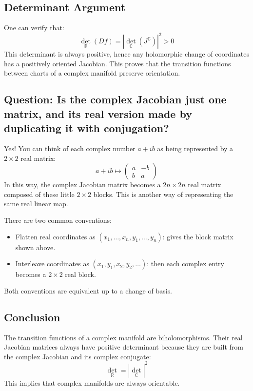\subsection*{Determinant Argument}

One can verify that:
\[
\det_{\mathbb{R}}(Df) = \left| \det_{\mathbb{C}}(J^{\mathbb{C}}) \right|^2 > 0
\]
This determinant is always positive, hence any holomorphic change of coordinates has a positively oriented Jacobian. This proves that the transition functions between charts of a complex manifold preserve orientation.

\subsection*{Question: Is the complex Jacobian just one matrix, and its real version made by duplicating it with conjugation?}

Yes! You can think of each complex number \( a + ib \) as being represented by a \(2 \times 2\) real matrix:
\[
a + ib \mapsto \begin{pmatrix}
a & -b \\
b & a
\end{pmatrix}
\]
In this way, the complex Jacobian matrix becomes a \(2n \times 2n\) real matrix composed of these little \(2 \times 2\) blocks. This is another way of representing the same real linear map.

There are two common conventions:
\begin{itemize}
    \item Flatten real coordinates as \( (x_1, \dots, x_n, y_1, \dots, y_n) \): gives the block matrix shown above.
    \item Interleave coordinates as \( (x_1, y_1, x_2, y_2, \dots) \): then each complex entry becomes a \(2 \times 2\) real block.
\end{itemize}

Both conventions are equivalent up to a change of basis.

\subsection*{Conclusion}

The transition functions of a complex manifold are biholomorphisms. Their real Jacobian matrices always have positive determinant because they are built from the complex Jacobian and its complex conjugate:
\[
\det_{\mathbb{R}} = |\det_{\mathbb{C}}|^2
\]
This implies that complex manifolds are always orientable.

